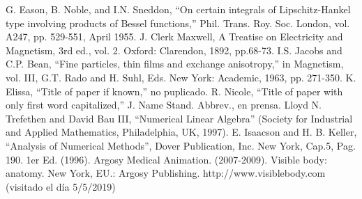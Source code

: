 \documentclass[a4paper, 10pt, conference]{ieeeconf}      %
\begin{document}






\begin{thebibliography}{99}

	G. Eason, B. Noble, and I.N. Sneddon, ``On certain integrals of Lipschitz-Hankel type involving products of Bessel functions,” Phil. Trans. Roy. Soc. London, vol. A247, pp. 529-551, April 1955. 
	J. Clerk Maxwell, A Treatise on Electricity and Magnetism, 3rd ed., vol. 2. Oxford: Clarendon, 1892, pp.68-73.
	I.S. Jacobs and C.P. Bean, ``Fine particles, thin films and exchange anisotropy,” in Magnetism, vol. III, G.T. Rado and H. Suhl, Eds. New York: Academic, 1963, pp. 271-350.
	K. Elissa, ``Title of paper if known,” no puplicado.
	R. Nicole, ``Title of paper with only first word capitalized,” J. Name Stand. Abbrev., en prensa. 
	Lloyd N. Trefethen and David Bau III, ``Numerical Linear Algebra” (Society for Industrial and Applied Mathematics, Philadelphia, UK, 1997).
	E. Isaacson and H. B. Keller, ``Analysis of Numerical Methods”, Dover Publication, Inc. New York, Cap.5, Pag. 190. 1er Ed. (1996).
    Argosy Medical Animation. (2007-2009). Visible body: anatomy. New York, EU.: Argosy Publishing. http://www.visiblebody.com (visitado el d\'ia 5/5/2019)

\end{thebibliography}
\end{document}
